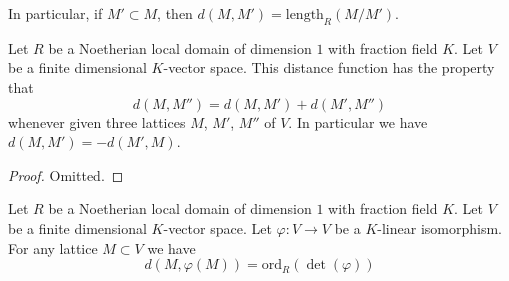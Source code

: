 \noindent
In particular, if $M' \subset M$, then
$d(M, M') = \text{length}_R(M/M')$.

\begin{lemma}
\label{lemma-properties-distance-function}
Let $R$ be a Noetherian local domain of dimension $1$ with
fraction field $K$. Let $V$ be a finite dimensional $K$-vector space.
This distance function has the property that
$$
d(M, M'') = d(M, M') + d(M', M'')
$$
whenever given three lattices $M$, $M'$, $M''$ of $V$.
In particular we have $d(M, M') = - d(M', M)$.
\end{lemma}

\begin{proof}
Omitted.
\end{proof}

\begin{lemma}
\label{lemma-order-vanishing-determinant}
Let $R$ be a Noetherian local domain of dimension $1$ with
fraction field $K$. Let $V$ be a finite dimensional $K$-vector space.
Let $\varphi : V \to V$ be a $K$-linear isomorphism.
For any lattice $M \subset V$ we have
$$
d(M, \varphi(M)) = \text{ord}_R(\det(\varphi))
$$
\end{lemma}


